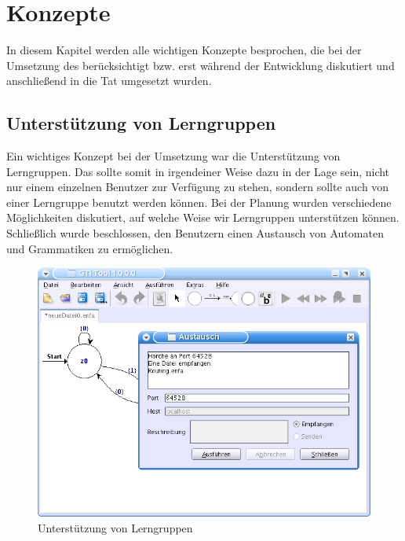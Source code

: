 

\chapter{Konzepte}\label{Concepts}

In diesem Kapitel werden alle wichtigen Konzepte besprochen, die bei der
Umsetzung des \gtitools berücksichtigt bzw. erst während der Entwicklung
diskutiert und anschließend in die Tat umgesetzt wurden.\vspace{10pt}


\section{Unterstützung von Lerngruppen}\label{ConceptsLerning}

Ein wichtiges Konzept bei der Umsetzung war die Unterstützung von Lerngruppen.
Das \gtitool sollte somit in irgendeiner Weise dazu in der Lage sein, nicht nur
einem einzelnen Benutzer zur Verfügung zu stehen, sondern sollte auch von einer
Lerngruppe benutzt werden können. Bei der Planung wurden verschiedene
Möglichkeiten diskutiert, auf welche Weise wir Lerngruppen unterstützen
können. Schließlich wurde beschlossen, den Benutzern einen Austausch von
Automaten und Grammatiken zu ermöglichen.\vspace{10pt}

\begin{figure}[h!]
\begin{center}
\includegraphics[width=12cm]{../images/exchange.png}
\caption{Unterstützung von Lerngruppen}
\label{FigureExchange}
\end{center}
\end{figure}
\vspace{10pt}

